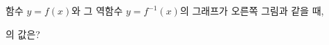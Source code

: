 \noindent\begin{minipage}[t]{0.58\linewidth}\vspace{0pt}\raggedright 함수 $y=f(x)$와 그 역함수 $y=f^{-1}(x)$의 그래프가 오른쪽 그림과 같을 때,\par\smallskip\end{minipage}\hfill\begin{minipage}[t]{0.4\linewidth}\vspace{0pt}\centering \resizebox{\ifdim\width>\linewidth\linewidth\else\width\fi}{!}{}\end{minipage}\par
\noindent {}\par\smallskip\noindent 의 값은?
